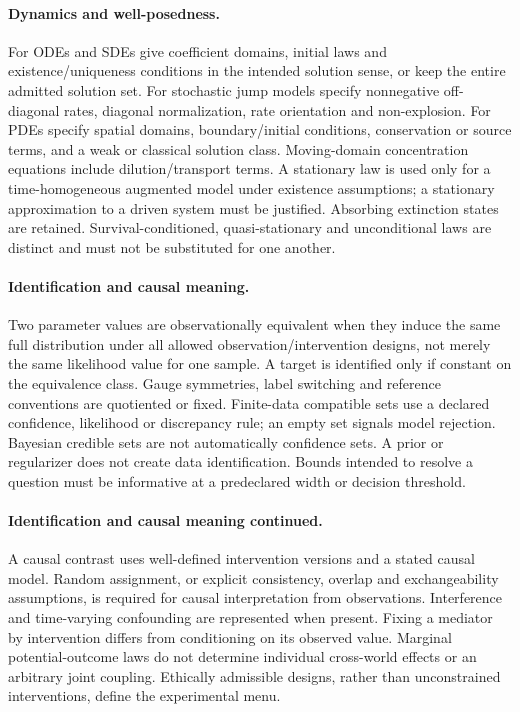 \documentclass[11pt]{article}
\begin{document}
\paragraph{Dynamics and well-posedness.}
For ODEs and SDEs give coefficient domains, initial laws and existence/uniqueness conditions in the intended solution sense, or keep the entire admitted solution set. For stochastic jump models specify nonnegative off-diagonal rates, diagonal normalization, rate orientation and non-explosion. For PDEs specify spatial domains, boundary/initial conditions, conservation or source terms, and a weak or classical solution class. Moving-domain concentration equations include dilution/transport terms. A stationary law is used only for a time-homogeneous augmented model under existence assumptions; a stationary approximation to a driven system must be justified. Absorbing extinction states are retained. Survival-conditioned, quasi-stationary and unconditional laws are distinct and must not be substituted for one another.

\paragraph{Identification and causal meaning.}
Two parameter values are observationally equivalent when they induce the same full distribution under all allowed observation/intervention designs, not merely the same likelihood value for one sample. A target is identified only if constant on the equivalence class. Gauge symmetries, label switching and reference conventions are quotiented or fixed. Finite-data compatible sets use a declared confidence, likelihood or discrepancy rule; an empty set signals model rejection. Bayesian credible sets are not automatically confidence sets. A prior or regularizer does not create data identification. Bounds intended to resolve a question must be informative at a predeclared width or decision threshold.

\paragraph{Identification and causal meaning continued.}
A causal contrast uses well-defined intervention versions and a stated causal model. Random assignment, or explicit consistency, overlap and exchangeability assumptions, is required for causal interpretation from observations. Interference and time-varying confounding are represented when present. Fixing a mediator by intervention differs from conditioning on its observed value. Marginal potential-outcome laws do not determine individual cross-world effects or an arbitrary joint coupling. Ethically admissible designs, rather than unconstrained interventions, define the experimental menu.
\end{document}
